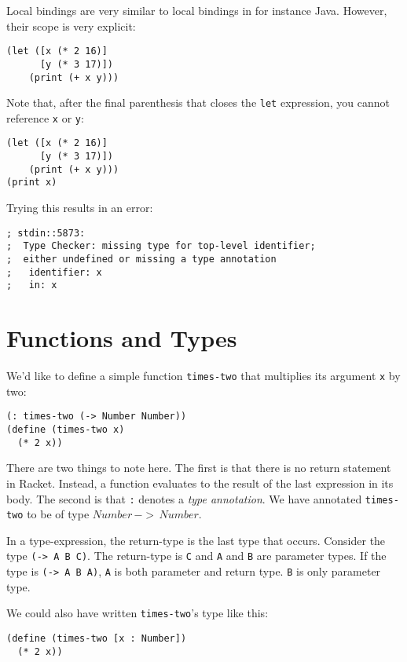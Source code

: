 \documentclass{article}
\begin{document}
Local bindings are very similar to local bindings in for instance Java. However, their scope is very explicit:

\begin{lstlisting}
(let ([x (* 2 16)]
      [y (* 3 17)])
    (print (+ x y)))
\end{lstlisting}

Note that, after the final parenthesis that closes the \lstinline{let} expression, you cannot reference \lstinline{x} or \lstinline{y}:

\begin{lstlisting}
(let ([x (* 2 16)]
      [y (* 3 17)])
    (print (+ x y)))
(print x)
\end{lstlisting}

Trying this results in an error:

\begin{verbatim}
; stdin::5873:
;  Type Checker: missing type for top-level identifier;
;  either undefined or missing a type annotation
;   identifier: x
;   in: x
\end{verbatim}

\section{Functions and Types}

We'd like to define a simple function \lstinline{times-two} that multiplies its argument \lstinline{x} by two:

\begin{lstlisting}
(: times-two (-> Number Number))
(define (times-two x)
  (* 2 x))
\end{lstlisting}

There are two things to note here. The first is that there is no return statement in Racket. Instead, a function evaluates to the result of the last expression in its body. The second is that \lstinline{:} denotes a \emph{type annotation}. We have annotated \lstinline{times-two} to be of type $Number \, -> \, Number$.

In a type-expression, the return-type is the last type that occurs. Consider the type \lstinline{(-> A B C)}. The return-type is \lstinline{C} and \lstinline{A} and \lstinline{B} are parameter types. If the type is \lstinline{(-> A B A)}, \lstinline{A} is both parameter and return type. \lstinline{B} is only parameter type.

We could also have written \lstinline{times-two}'s type like this:

\begin{lstlisting}
(define (times-two [x : Number])
  (* 2 x))
\end{lstlisting}
\end{document}
